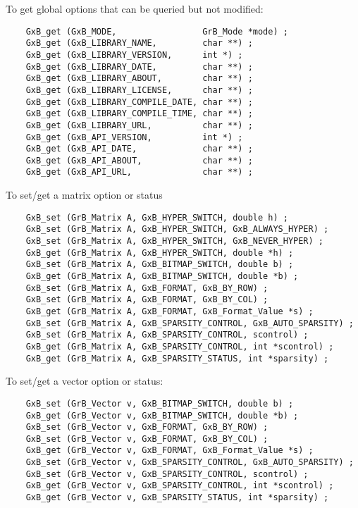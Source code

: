 \documentclass[12pt]{article}
\begin{document}
\noindent
To get global options that can be queried but not modified:

    {\footnotesize
    \begin{verbatim}
    GxB_get (GxB_MODE,                 GrB_Mode *mode) ;
    GxB_get (GxB_LIBRARY_NAME,         char **) ;
    GxB_get (GxB_LIBRARY_VERSION,      int *) ;
    GxB_get (GxB_LIBRARY_DATE,         char **) ;
    GxB_get (GxB_LIBRARY_ABOUT,        char **) ;
    GxB_get (GxB_LIBRARY_LICENSE,      char **) ;
    GxB_get (GxB_LIBRARY_COMPILE_DATE, char **) ;
    GxB_get (GxB_LIBRARY_COMPILE_TIME, char **) ;
    GxB_get (GxB_LIBRARY_URL,          char **) ;
    GxB_get (GxB_API_VERSION,          int *) ;
    GxB_get (GxB_API_DATE,             char **) ;
    GxB_get (GxB_API_ABOUT,            char **) ;
    GxB_get (GxB_API_URL,              char **) ; \end{verbatim} }

\noindent
To set/get a matrix option or status

    {\footnotesize
    \begin{verbatim}
    GxB_set (GrB_Matrix A, GxB_HYPER_SWITCH, double h) ;
    GxB_set (GrB_Matrix A, GxB_HYPER_SWITCH, GxB_ALWAYS_HYPER) ;
    GxB_set (GrB_Matrix A, GxB_HYPER_SWITCH, GxB_NEVER_HYPER) ;
    GxB_get (GrB_Matrix A, GxB_HYPER_SWITCH, double *h) ;
    GxB_set (GrB_Matrix A, GxB_BITMAP_SWITCH, double b) ;
    GxB_get (GrB_Matrix A, GxB_BITMAP_SWITCH, double *b) ;
    GxB_set (GrB_Matrix A, GxB_FORMAT, GxB_BY_ROW) ;
    GxB_set (GrB_Matrix A, GxB_FORMAT, GxB_BY_COL) ;
    GxB_get (GrB_Matrix A, GxB_FORMAT, GxB_Format_Value *s) ;
    GxB_set (GrB_Matrix A, GxB_SPARSITY_CONTROL, GxB_AUTO_SPARSITY) ;
    GxB_set (GrB_Matrix A, GxB_SPARSITY_CONTROL, scontrol) ;
    GxB_get (GrB_Matrix A, GxB_SPARSITY_CONTROL, int *scontrol) ;
    GxB_get (GrB_Matrix A, GxB_SPARSITY_STATUS, int *sparsity) ; \end{verbatim} }

\noindent
To set/get a vector option or status:

    {\footnotesize
    \begin{verbatim}
    GxB_set (GrB_Vector v, GxB_BITMAP_SWITCH, double b) ;
    GxB_get (GrB_Vector v, GxB_BITMAP_SWITCH, double *b) ;
    GxB_set (GrB_Vector v, GxB_FORMAT, GxB_BY_ROW) ;
    GxB_set (GrB_Vector v, GxB_FORMAT, GxB_BY_COL) ;
    GxB_get (GrB_Vector v, GxB_FORMAT, GxB_Format_Value *s) ;
    GxB_set (GrB_Vector v, GxB_SPARSITY_CONTROL, GxB_AUTO_SPARSITY) ;
    GxB_set (GrB_Vector v, GxB_SPARSITY_CONTROL, scontrol) ;
    GxB_get (GrB_Vector v, GxB_SPARSITY_CONTROL, int *scontrol) ;
    GxB_get (GrB_Vector v, GxB_SPARSITY_STATUS, int *sparsity) ; \end{verbatim} }
\end{document}

